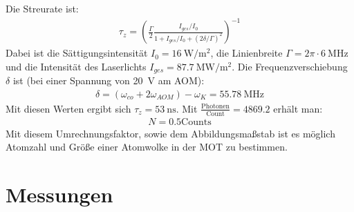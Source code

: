 \documentclass[12pt, a4paper]{article}
\begin{document}
    Die Streurate ist:
    \begin{align*}
      \tau_z = \left(
        \frac{\Gamma}{2}
        \frac{I_{ges} / I_0}{1 + I_{ges} / I_0 + (2 \delta / \Gamma)^2}
      \right)^{-1}
    \end{align*}
    Dabei ist die Sättigungsintensität $I_0 = \SI{16}{\W\per\square\m}$, die
    Linienbreite $\Gamma = 2 \pi \cdot \SI{6}{\MHz}$ und die Intensität des Laserlichts
    $I_{ges} = \SI{87.7}{\mega\W\per\square\m}$. Die Frequenzverschiebung $\delta$ ist
    (bei einer Spannung von \SI{20}{\V} am AOM):
    \begin{align*}
      \delta = (\omega_{co} + 2 \omega_{AOM}) - \omega_K = \SI{55.78}{\MHz}
    \end{align*}
    Mit diesen Werten ergibt sich $\tau_z = \SI{53}{\nano\s}$. Mit
    $\frac{\text{Photonen}}{\text{Count}} = 4869.2$ erhält man:
    \begin{align*}
      N = 0.5 \text{Counts}
    \end{align*}
    Mit diesem Umrechnungsfaktor, sowie dem Abbildungsmaßstab ist es möglich Atomzahl
    und Größe einer Atomwolke in der MOT zu bestimmen.
\newpage
\section{Messungen}
\end{document}
